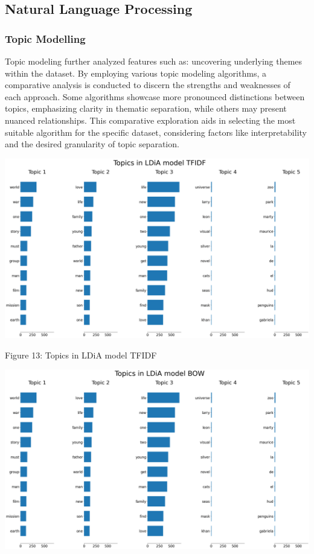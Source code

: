 \documentclass{article}
\begin{document}
\begin{multicols}{2}
\subsection{Natural Language Processing}

\subsubsection{Topic Modelling}

Topic modeling further analyzed features such as: uncovering underlying themes within the dataset. By employing various topic modeling algorithms, a comparative analysis is conducted to discern the strengths and weaknesses of each approach. Some algorithms showcase more pronounced distinctions between topics, emphasizing clarity in thematic separation, while others may present nuanced relationships. This comparative exploration aids in selecting the most suitable algorithm for the specific dataset, considering factors like interpretability and the desired granularity of topic separation.

\includegraphics[scale=.1]{img/nlp1.png}

{\small
  Figure 13: Topics in LDiA model TFIDF
  \par
  \vspace{6pt}
}

\includegraphics[scale=.1]{img/nlp2.png}


\end{multicols}
\end{document}
